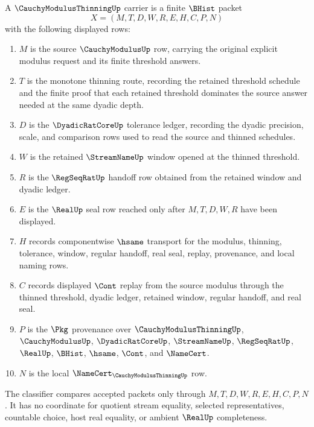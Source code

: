 \begin{definition}
\label{def:cauchy-modulus-thinning-carrier}
A $\CauchyModulusThinningUp$ carrier is a finite $\BHist$ packet
$$
X=(M,T,D,W,R,E,H,C,P,N)
$$
with the following displayed rows:
\begin{enumerate}
\item $M$ is the source $\CauchyModulusUp$ row, carrying the original explicit modulus request and its finite threshold answers.
\item $T$ is the monotone thinning route, recording the retained threshold schedule and the finite proof that each retained threshold dominates the source answer needed at the same dyadic depth.
\item $D$ is the $\DyadicRatCoreUp$ tolerance ledger, recording the dyadic precision, scale, and comparison rows used to read the source and thinned schedules.
\item $W$ is the retained $\StreamNameUp$ window opened at the thinned threshold.
\item $R$ is the $\RegSeqRatUp$ handoff row obtained from the retained window and dyadic ledger.
\item $E$ is the $\RealUp$ seal row reached only after $M,T,D,W,R$ have been displayed.
\item $H$ records componentwise $\hsame$ transport for the modulus, thinning, tolerance, window, regular handoff, real seal, replay, provenance, and local naming rows.
\item $C$ records displayed $\Cont$ replay from the source modulus through the thinned threshold, dyadic ledger, retained window, regular handoff, and real seal.
\item $P$ is the $\Pkg$ provenance over $\CauchyModulusThinningUp$, $\CauchyModulusUp$, $\DyadicRatCoreUp$, $\StreamNameUp$, $\RegSeqRatUp$, $\RealUp$, $\BHist$, $\hsame$, $\Cont$, and $\NameCert$.
\item $N$ is the local $\NameCert_{\CauchyModulusThinningUp}$ row.
\end{enumerate}
The classifier compares accepted packets only through $M,T,D,W,R,E,H,C,P,N$. It has no coordinate for quotient stream equality, selected representatives, countable choice, host real equality, or ambient $\RealUp$ completeness.
\end{definition}

